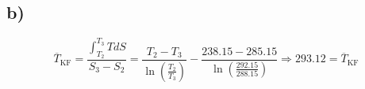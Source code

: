 

\subsection*{b)}

\[
\overline{T}_{\text{KF}} = \frac{\int_{T_2}^{T_3} T dS}{S_3 - S_2} = \frac{T_2 - T_3}{\ln \left( \frac{T_2}{T_3} \right)} - \frac{238.15 - 285.15}{\ln \left( \frac{292.15}{288.15} \right)} \Rightarrow 293.12 = \overline{T}_{\text{KF}}
\]